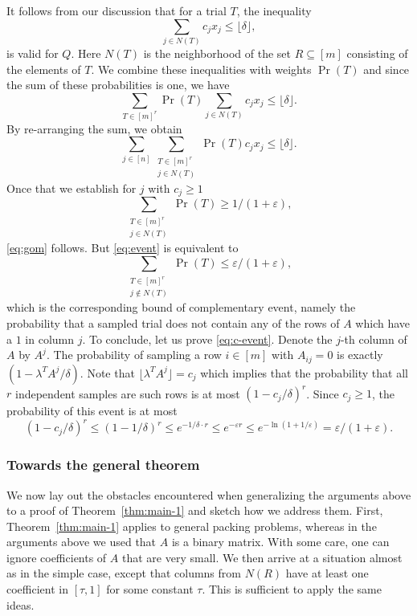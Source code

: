 \documentclass[11pt]{article}
\theoremstyle{remark}
\begin{document}
It follows from our discussion that for a trial $T$, the inequality
\begin{equation}
  \label{eq:trial}
  ∑_{j ∈ N(T)} c_j x_j ≤ ⌊δ⌋, 
\end{equation}
is valid for $Q$. Here $N(T)$ is the neighborhood of the set $R⊆[m]$ consisting of the  elements of  $T$.  We combine these inequalities with weights $\Pr(T)$ and since the sum of these probabilities is one, we have
\begin{equation}
  \label{eq:trial}
 ∑_{T ∈ [m]^r} \Pr(T)  ∑_{j ∈ N(T)} c_j x_j ≤ ⌊δ⌋. 
\end{equation}
By re-arranging the sum, we obtain
\begin{equation}
  \label{eq:tr-re}
  ∑_{j ∈ [n]} ∑_{\substack{T ∈ [m]^r \\ j ∈ N(T)}} \Pr(T)   c_j x_j≤ ⌊δ⌋.  
\end{equation}
Once that we establish for $j$ with $c_j ≥ 1$ 
\begin{equation}
  \label{eq:event}
  ∑_{\substack{T ∈ [m]^r \\ j ∈ N(T)}} \Pr(T) ≥ 1/ (1+ε), 
\end{equation}
\eqref{eq:gom} follows. But \eqref{eq:event} is equivalent to 
\begin{equation}
  \label{eq:c-event}
  ∑_{\substack{T ∈ [m]^r \\ j ∉ N(T)}} \Pr(T) ≤ ε / (1+ε), 
\end{equation}
which is the corresponding bound of complementary event, namely the probability that a sampled trial does not contain any of the rows of $A$ which have a $1$ in column $j$.
To conclude, let us prove \eqref{eq:c-event}. 
Denote the $j$-th column of $A$ by $A^j$.
The probability of sampling a row $i\in [m]$ with $A_{ij}=0$ is exactly $(1- λ^TA^{j}  / δ)$. 
Note that $ ⌊λ^TA^{j}⌋  = c_j$ which implies that the probability that all $r$ independent samples are such rows is at most $(1- c_j / δ)^r$. 
Since $c_j≥1$,  the probability of this event is at most
\begin{displaymath}
  (1- c_j / δ)^r ≤ (1- 1 / δ)^r ≤ e^{-1/δ ⋅ r} ≤ e^{-ε r} ≤ e^{- \ln (1 + 1/ε)} = ε / (1+ε). 
\end{displaymath}

\subsubsection*{Towards the general theorem}
We now lay out the obstacles encountered when generalizing the arguments above to a proof of Theorem~\ref{thm:main-1}
and sketch how we address them.
First, Theorem~\ref{thm:main-1} applies to general packing problems, whereas in the arguments above we
used that $A$ is a binary matrix.
With some care, one can ignore coefficients of $A$ that are very small.
We then arrive at a situation almost as in the simple case, except that columns from $N(R)$ 
have at least one coefficient in $[\tau, 1]$ for some constant $\tau$. This is sufficient to apply the same ideas.
\end{document}

